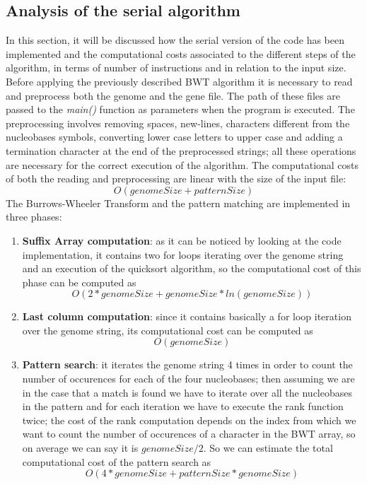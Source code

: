 \documentclass[final,5p,times,twocolumn,authoryear]{elsarticle}
\begin{document}
\subsection{Analysis of the serial algorithm}
In this section, it will be discussed how the serial version of the code has been implemented and the computational costs associated to the different steps of the algorithm, in terms of number of instructions and in relation to the input size. \\
Before applying the previously described BWT algorithm it is necessary to read and preprocess both the genome and the gene file. The path of these files are passed to the \emph{main()} function as parameters when the program is executed. The preprocessing involves removing spaces, new-lines, characters different from the nucleobases symbols, converting lower case letters to upper case and adding a termination character at the end of the preprocessed strings; all these operations are necessary for the correct execution of the algorithm. The computational costs of both the reading and preprocessing are linear with the size of the input file: 
$$ O(genomeSize + patternSize) $$
The Burrows-Wheeler Transform and the pattern matching are implemented in three phases: \\
\begin{enumerate}
    \item \textbf{Suffix Array computation}: as it can be noticed by looking at the code implementation, it contains two for loops iterating over the genome string and an execution of the quicksort algorithm, so the computational cost of this phase can be computed as $$O(2*genomeSize + genomeSize*ln(genomeSize))$$
    \item \textbf{Last column computation}: since it contains basically a for loop iteration over the genome string, its computational cost can be computed as $$O(genomeSize)$$
    \item \textbf{Pattern search}: it iterates the genome string 4 times in order to count the number of occurences for each of the four nucleobases; then assuming we are in the case that a match is found we have to iterate over all the nucleobases in the pattern and for each iteration we have to execute the rank function twice; the cost of the rank computation depends on the index from which we want to count the number of occurences of a character in the BWT array, so on average we can say it is $genomeSize/2$. So we can estimate the total computational cost of the pattern search as
    $$O(4*genomeSize + patternSize*genomeSize)$$
\end{enumerate}
\end{document}
